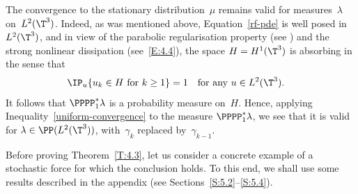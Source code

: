 \begin{remark}
The convergence to the stationary distribution~$\mu$ remains valid for measures~$\lambda$ on~$L^2(\T^3)$. Indeed, as was mentioned above, Equation~\eqref{rf-pde} is well posed in~$L^2(\T^3)$, and in view of the parabolic regularisation property (\eg see \cite[Chap.\,1,\,\S5]{BV1992}) and the strong nonlinear dissipation (see~\eqref{E:4.4}), the space $H=H^1(\T^3)$ is absorbing in the sense that
\begin{align}
\IP_u\{u_k\in H\text{ for $k\ge1$}\}&=1 \quad\text{for any $u\in L^2(\T^3)$}.
\label{absorption}
\end{align}
It follows that $\PPPP_1^*\lambda$ is a probability measure on~$H$. Hence, applying Inequality~\eqref{uniform-convergence} to the measure $\PPPP_1^*\lambda$, we see that it is valid for $\lambda\in\PP(L^2(\T^3))$, with~$\gamma_k$ replaced by~$\gamma_{k-1}$.
\end{remark}

Before proving Theorem~\ref{T:4.3}, let us consider a concrete example of a stochastic force for which the conclusion holds. To this end, we shall use some results described in the appendix (see Sections~\ref{S:5.2}--\ref{S:5.4}).

